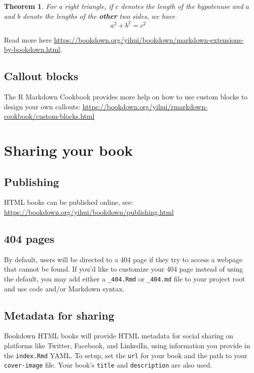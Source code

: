 \documentclass[
]{book}
\newtheorem{theorem}{Theorem}[chapter]
\theoremstyle{definition}
\theoremstyle{definition}
\theoremstyle{definition}
\theoremstyle{definition}
\theoremstyle{remark}
\begin{document}
\begin{theorem}
\protect\hypertarget{thm:tri}{}\label{thm:tri}For a right triangle, if \(c\) denotes the \emph{length} of the hypotenuse
and \(a\) and \(b\) denote the lengths of the \textbf{other} two sides, we have
\[a^2 + b^2 = c^2\]
\end{theorem}

Read more here \url{https://bookdown.org/yihui/bookdown/markdown-extensions-by-bookdown.html}.

\hypertarget{callout-blocks}{%
\section{Callout blocks}\label{callout-blocks}}

The R Markdown Cookbook provides more help on how to use custom blocks to design your own callouts: \url{https://bookdown.org/yihui/rmarkdown-cookbook/custom-blocks.html}

\hypertarget{sharing-your-book}{%
\chapter{Sharing your book}\label{sharing-your-book}}

\hypertarget{publishing}{%
\section{Publishing}\label{publishing}}

HTML books can be published online, see: \url{https://bookdown.org/yihui/bookdown/publishing.html}

\hypertarget{pages}{%
\section{404 pages}\label{pages}}

By default, users will be directed to a 404 page if they try to access a webpage that cannot be found. If you'd like to customize your 404 page instead of using the default, you may add either a \texttt{\_404.Rmd} or \texttt{\_404.md} file to your project root and use code and/or Markdown syntax.

\hypertarget{metadata-for-sharing}{%
\section{Metadata for sharing}\label{metadata-for-sharing}}

Bookdown HTML books will provide HTML metadata for social sharing on platforms like Twitter, Facebook, and LinkedIn, using information you provide in the \texttt{index.Rmd} YAML. To setup, set the \texttt{url} for your book and the path to your \texttt{cover-image} file. Your book's \texttt{title} and \texttt{description} are also used.
\end{document}
